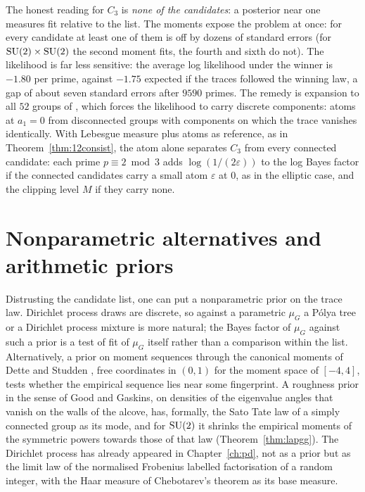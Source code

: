 The honest reading for $C_3$ is \emph{none of the candidates}: a posterior near one measures fit relative to the list. The moments expose the problem at once: for every candidate at least one of them is off by dozens of standard errors (for $\mathrm{SU}(2)\times\mathrm{SU}(2)$ the second moment fits, the fourth and sixth do not). The likelihood is far less sensitive: the average log likelihood under the winner is $-1.80$ per prime, against $-1.75$ expected if the traces followed the winning law, a gap of about seven standard errors after $9590$ primes. The remedy is expansion to all $52$ groups of \cite{fkrs2012}, which forces the likelihood to carry discrete components: atoms at $a_1=0$ from disconnected groups with components on which the trace vanishes identically. With Lebesgue measure plus atoms as reference, as in Theorem~\ref{thm:12consist}, the atom alone separates $C_3$ from every connected candidate: each prime $p\equiv2\bmod3$ adds $\log(1/(2\varepsilon))$ to the log Bayes factor if the connected candidates carry a small atom $\varepsilon$ at $0$, as in the elliptic case, and the clipping level $M$ if they carry none.

\section{Nonparametric alternatives and arithmetic priors}

Distrusting the candidate list, one can put a nonparametric prior on the trace law. Dirichlet process draws \cite{ferguson1973} are discrete, so against a parametric $\mu_G$ a P\'olya tree \cite{lavine1992} or a Dirichlet process mixture is more natural; the Bayes factor of $\mu_G$ against such a prior is a test of fit of $\mu_G$ itself rather than a comparison within the list. Alternatively, a prior on moment sequences through the canonical moments of Dette and Studden \cite{dettestudden1997}, free coordinates in $(0,1)$ for the moment space of $[-4,4]$, tests whether the empirical sequence lies near some fingerprint. A roughness prior in the sense of Good and Gaskins, on densities of the eigenvalue angles that vanish on the walls of the alcove, has, formally, the Sato Tate law of a simply connected group as its mode, and for $\mathrm{SU}(2)$ it shrinks the empirical moments of the symmetric powers towards those of that law (Theorem~\ref{thm:lapgg}). The Dirichlet process has already appeared in Chapter~\ref{ch:pd}, not as a prior but as the limit law of the normalised Frobenius labelled factorisation of a random integer, with the Haar measure of Chebotarev's theorem as its base measure.

